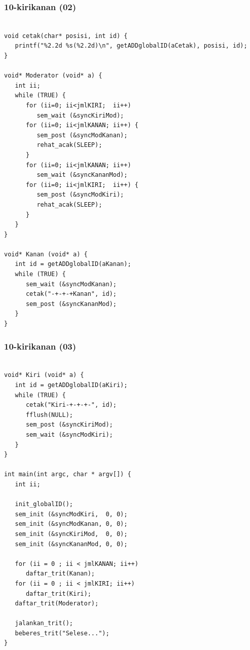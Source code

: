 \documentclass[xcolor=table, notheorems, hyperref={pdfpagelabels=false}]{beamer}
\begin{document}
\begin{frame}[fragile]
\frametitle{10-kirikanan (02)}
\begin{lstlisting}[basicstyle=\ttfamily\tiny]

void cetak(char* posisi, int id) {
   printf("%2.2d %s(%2.2d)\n", getADDglobalID(aCetak), posisi, id);
}

void* Moderator (void* a) {
   int ii;
   while (TRUE) {
      for (ii=0; ii<jmlKIRI;  ii++)
         sem_wait (&syncKiriMod);
      for (ii=0; ii<jmlKANAN; ii++) {
         sem_post (&syncModKanan);
         rehat_acak(SLEEP);
      }
      for (ii=0; ii<jmlKANAN; ii++)
         sem_wait (&syncKananMod);
      for (ii=0; ii<jmlKIRI;  ii++) {
         sem_post (&syncModKiri);
         rehat_acak(SLEEP);
      }
   }
}

void* Kanan (void* a) {
   int id = getADDglobalID(aKanan);
   while (TRUE) {
      sem_wait (&syncModKanan);
      cetak("-+-+-+Kanan", id);
      sem_post (&syncKananMod);
   }
}

\end{lstlisting}
\end{frame}

\begin{frame}[fragile]
\frametitle{10-kirikanan (03)}
\begin{lstlisting}[basicstyle=\ttfamily\tiny]

void* Kiri (void* a) {
   int id = getADDglobalID(aKiri);
   while (TRUE) {
      cetak("Kiri-+-+-+-", id);
      fflush(NULL);
      sem_post (&syncKiriMod);
      sem_wait (&syncModKiri);
   }
}

int main(int argc, char * argv[]) {
   int ii;

   init_globalID();
   sem_init (&syncModKiri,  0, 0);
   sem_init (&syncModKanan, 0, 0);
   sem_init (&syncKiriMod,  0, 0);
   sem_init (&syncKananMod, 0, 0);

   for (ii = 0 ; ii < jmlKANAN; ii++)
      daftar_trit(Kanan);
   for (ii = 0 ; ii < jmlKIRI; ii++)
      daftar_trit(Kiri);
   daftar_trit(Moderator);

   jalankan_trit();
   beberes_trit("Selese...");
}

\end{lstlisting}
\end{frame}
\end{document}
